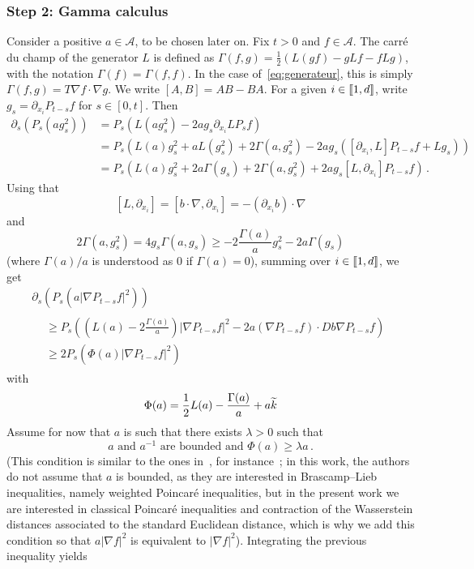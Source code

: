 \documentclass[10pt]{amsart}
\theoremstyle{definition}\newtheorem{defi}[theo]{Definition}\newtheorem{rema}[theo]{Remark}\newtheorem{exam}[theo]{Example}\newtheorem{exem}[theo]{Example}\newtheorem{nota}[theo]{Notation}
\newcommand{\llbracket}{\mathopen{[\mkern -2.7mu[}}
\newcommand{\rrbracket}{\mathclose{]\mkern -2.7mu]}}
\newcommand{\A}{\mathcal A}
\newcommand{\na}{\nabla}
\newcommand{\1}{\mathbbm{1}}
\newcommand{\nv}[1]{#1}
\let\oldtilde\tilde
\renewcommand*{\tilde}[1]{\mathchoice{\widetilde{#1}}{\widetilde{#1}}{\oldtilde{#1}}{\oldtilde{#1}}}
\providecommand{\llbracket}{\mathopen{[\mkern-2.7mu[}}\providecommand{\rrbracket}{\mathclose{]\mkern-2.7mu]}}
\begin{document}
\subsubsection{Step 2: Gamma calculus}


Consider a positive $a\in\A$, to be chosen later on. Fix $t>0$ and $f\in\A$. The carré du champ of the generator $L$ is defined as $\Gamma(f,g) = \frac12 ( L(gf) - g Lf-fLg)$, with the notation $\Gamma(f)=\Gamma(f,f)$. In the case of~\eqref{eq:generateur}, this is simply $\Gamma(f,g)=T\na f\cdot\na g$. We write $[A,B]=AB-BA$. For a given $i\in\llbracket 1,d\rrbracket$, write $g_s = \partial_{x_i} P_{t-s} f$ for $s\in[0,t]$. Then
\begin{align*}
\partial_s \left( P_s(a g_s^2)\right) &= P_{s} \left( L(ag_s^2) - 2a g_s \partial_{x_i} LP_s f \right) \\
&= P_{s} \left( L(a)g_s^2 + aL(g_s^2) + 2 \Gamma(a,g_s^2)- 2a g_s \left(\left[\partial_{x_i}, L\right] P_{t-s} f + Lg_s\right)\right) \\
&= P_{s} \left( L(a)g_s^2 + 2a\Gamma(g_s) + 2 \Gamma(a,g_s^2)+ 2a g_s [L,\partial_{x_i}] P_{t-s} f\right)\,.
\end{align*}
Using that
\[
\left[L,\partial_{x_i}\right] = \left[b\cdot \na,\partial_{x_i}\right] = -(\partial_{x_i} b) \cdot \na
\]
and
\[
2\Gamma(a,g_s^2) = 4g_s \Gamma(a,g_s) \geqslant -2\frac{\Gamma(a)}{ a} g_s^2 - 2 a \Gamma(g_s)
\]
(where $\Gamma(a)/a$ is understood as $0$ if $\Gamma(a)=0$), summing over $i\in\llbracket 1,d\rrbracket$, we get
\begin{multline*}
\partial_s \left( P_s \left( a \left|\na P_{t-s}f\right|^2\right) \right)\\
\begin{aligned}
&\geqslant P_{s} \left( \left( L(a) - 2\frac{\Gamma(a)}{ a}\right)\left|\na P_{t-s} f\right|^2 - 2a (\na P_{t-s} f) \cdot \nv{D b} \na P_{t-s} f\right) \\
&\geqslant 2 P_{s} \left( \Phi(a) \left|\na P_{t-s} f\right|^2\right)
\end{aligned}
\end{multline*}
with
\[
\Phi(a) = \frac12 L(a) - \frac{\Gamma(a)}{ a} + a \tilde k
\]
Assume for now that $a$ is such that there exists $\lambda>0$ such that
\begin{equation}\label{eq:conditionaBakryEmery}
a \text{ and }a^{-1}\text{ are bounded and } \Phi(a) \geqslant \lambda a \,.
\end{equation}
(This condition is similar to the ones in~\cite{arnaudon2018intertwinings,bonnefont2022note,BonnefontJoulinMa,10.3150/12-BEJ433}, for instance~\cite[Theorem~3.2]{arnaudon2018intertwinings}; in this work, the authors do not assume that $a$ is bounded, as they are interested in Brascamp--Lieb inequalities, namely weighted Poincaré inequalities, but in the present work we are interested in classical Poincaré inequalities and contraction of the Wasserstein distances associated to the standard Euclidean distance, which is why we add this condition so that $a|\na f|^2$ is equivalent to $|\na f|^2$). Integrating the previous inequality yields
\end{document}
